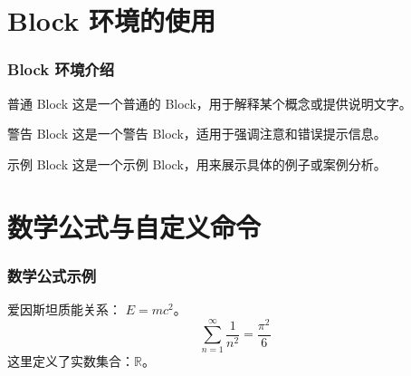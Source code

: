 \documentclass[10pt,aspectratio=169,mathserif]{beamer}
\begin{document}
\section{Block 环境的使用}
\begin{frame}
    \frametitle{Block 环境介绍}
    \begin{block}{普通 Block}
        这是一个普通的 Block，用于解释某个概念或提供说明文字。
    \end{block}
    
    \begin{alertblock}{警告 Block}
        这是一个警告 Block，适用于强调注意和错误提示信息。
    \end{alertblock}
    
    \begin{exampleblock}{示例 Block}
        这是一个示例 Block，用来展示具体的例子或案例分析。
    \end{exampleblock}
\end{frame}

\section{数学公式与自定义命令}
\begin{frame}
    \frametitle{数学公式示例}
    爱因斯坦质能关系： $E = mc^2$。
    \[
    \sum_{n=1}^{\infty} \frac{1}{n^2} = \frac{\pi^2}{6}
    \]
    \newcommand{\Real}{\mathbb{R}}
    这里定义了实数集合：$\Real$。
\end{frame}

\end{document}
